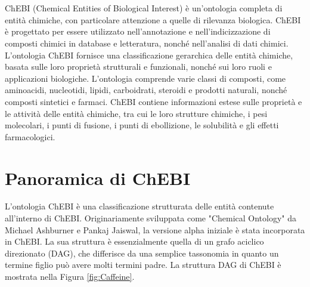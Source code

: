 \documentclass[12pt,a4paper,openright,twoside]{book}
\begin{document}
\frontmatter



\tableofcontents

\mainmatter

\chapter{\introductionname}
\label{chap:introduction}

ChEBI (Chemical Entities of Biological Interest) è un'ontologia completa di entità chimiche, con particolare attenzione a quelle di rilevanza biologica. ChEBI è progettato per essere utilizzato nell'annotazione e nell'indicizzazione di composti chimici in database e letteratura, nonché nell'analisi di dati chimici.
L'ontologia ChEBI fornisce una classificazione gerarchica delle entità chimiche, basata sulle loro proprietà strutturali e funzionali, nonché sui loro ruoli e applicazioni biologiche. L'ontologia comprende varie classi di composti, come aminoacidi, nucleotidi, lipidi, carboidrati, steroidi e prodotti naturali, nonché composti sintetici e farmaci.
ChEBI contiene informazioni estese sulle proprietà e le attività delle entità chimiche, tra cui le loro strutture chimiche, i pesi molecolari, i punti di fusione, i punti di ebollizione, le solubilità e gli effetti farmacologici.

\chapter{Panoramica di ChEBI}
\label{chap:panoramica}
L'ontologia ChEBI è una classificazione strutturata delle entità contenute all'interno di ChEBI. Originariamente sviluppata come "Chemical Ontology" da Michael Ashburner e Pankaj Jaiswal, la versione alpha iniziale è stata incorporata in ChEBI. La sua struttura è essenzialmente quella di un grafo aciclico direzionato (DAG), che differisce da una semplice tassonomia in quanto un termine figlio può avere molti termini padre. La struttura DAG di ChEBI è mostrata nella Figura \ref{fig:Caffeine}.
\end{document}
